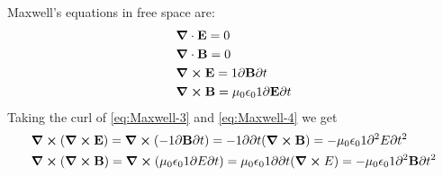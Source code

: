 \documentclass[english, a4paper, 12pt, twoside]{article}
\numberwithin{equation}{section} %
\begin{document}
Maxwell's equations in free space are:
\begin{subequations}
    \label{eq:optim}
    \begin{align}
        &\grad \cdot \textbf{E} = 0 \label{eq:Maxwell-1}\\
        &\grad \cdot \textbf{B} = 0 \label{eq:Maxwell-2}\\
        &\grad \cross \textbf{E} = 1{\partial\textbf{B}}{\partial t} \label{eq:Maxwell-3}\\
        &\grad \cross \textbf{B} = \mu_0 \epsilon_0 1{\partial\textbf{E}}{\partial t} \label{eq:Maxwell-4}
    \end{align}
\end{subequations}
Taking the curl of \ref{eq:Maxwell-3} and \ref{eq:Maxwell-4} we get
\begin{subequations} 
\label{eq:curl-}
    \begin{align}
        &\curl{(\curl{\textbf{E}})} 
        = \curl{(-1{\partial \textbf{B}}{\partial t})} 
        = -1{\partial}{\partial t}(\curl{\textbf{B}})
        = - \mu_0 \epsilon_0 1{\partial^2 E}{\partial t^2} 
        \label{eq:curl-E}\\
        &\curl{(\curl{\textbf{B}})} 
        = \curl{(\mu_0 \epsilon_0 1{\partial E}{\partial t})} 
        = \mu_0 \epsilon_01{\partial}{\partial t}(\curl{E}) 
        = - \mu_0 \epsilon_0 1{\partial^2 \textbf{B}}{\partial t^2} 
        \label{eq:curl-B}
    \end{align}
\end{subequations}
   
\end{document}
